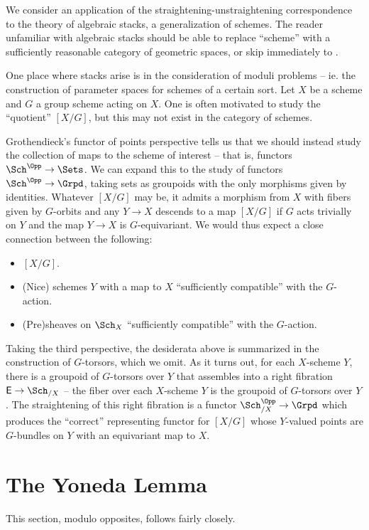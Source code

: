 \documentclass{amsart}
\theoremstyle{definition}
\numberwithin{equation}{section}
\begin{document}
We consider an application of the straightening-unstraightening correspondence to the theory of algebraic stacks, a generalization of schemes. The reader unfamiliar with algebraic stacks should be able to replace ``scheme'' with a sufficiently reasonable category of geometric spaces, or skip immediately to .

One place where stacks arise is in the consideration of moduli problems -- ie. the construction of parameter spaces for schemes of a certain sort. Let $X$ be a scheme and $G$ a group scheme acting on $X$. One is often motivated to study the ``quotient'' $[X/G]$, but this may not exist in the category of schemes.

Grothendieck's functor of points perspective tells us that we should instead study the collection of maps to the scheme of interest -- that is, functors $\Sch^{\Opp}\to\Sets$. We can expand this to the study of functors $\Sch^{\Opp}\to\Grpd$, taking sets as groupoids with the only morphisms given by identities. Whatever $[X/G]$ may be, it admits a morphism from $X$ with fibers given by $G$-orbits and any $Y\to X$ descends to a map $[X/G]$ if $G$ acts trivially on $Y$ and the map $Y\to X$ is $G$-equivariant. We would thus expect a close connection between the following:
\begin{itemize}
  \item $[X/G]$.
  \item (Nice) schemes $Y$ with a map to $X$ ``sufficiently compatible'' with the $G$-action.
  \item (Pre)sheaves on $\Sch_{X}$ ``sufficiently compatible'' with the $G$-action.
\end{itemize}

Taking the third perspective, the desiderata above is summarized in the construction of $G$-torsors, which we omit. As it turns out, for each $X$-scheme $Y$, there is a groupoid of $G$-torsors over $Y$ that assembles into a right fibration $\mathsf{E}\to\Sch_{/X}$ -- the fiber over each $X$-scheme $Y$ is the groupoid of $G$-torsors over $Y$. The straightening of this right fibration is a functor $\Sch_{/X}^{\Opp}\to\Grpd$ which produces the ``correct'' representing functor for $[X/G]$ whose $Y$-valued points are $G$-bundles on $Y$ with an equivariant map to $X$.
\section{The Yoneda Lemma}\label{sec: Yoneda}
This section, modulo opposites, follows \cite[\S 5.3]{Wagner} fairly closely.
\end{document}
